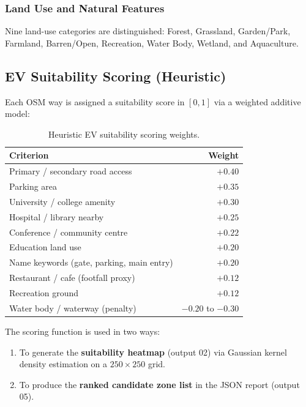 \documentclass[12pt, a4paper]{article}
\begin{document}
\subsubsection{Land Use and Natural Features}

Nine land-use categories are distinguished: Forest, Grassland, 
Garden/Park, Farmland, Barren/Open, Recreation, Water Body, Wetland, 
and Aquaculture.

\subsection{EV Suitability Scoring (Heuristic)}

Each OSM way is assigned a suitability score in $[0, 1]$ via a 
weighted additive model:

\begin{table}[H]
\centering
\caption{Heuristic EV suitability scoring weights.}
\label{tab:ev_score}
\begin{tabular}{@{}lr@{}}
\toprule
\textbf{Criterion} & \textbf{Weight} \\
\midrule
Primary / secondary road access & $+0.40$ \\
Parking area & $+0.35$ \\
University / college amenity & $+0.30$ \\
Hospital / library nearby & $+0.25$ \\
Conference / community centre & $+0.22$ \\
Education land use & $+0.20$ \\
Name keywords (gate, parking, main entry) & $+0.20$ \\
Restaurant / cafe (footfall proxy) & $+0.12$ \\
Recreation ground & $+0.12$ \\
Water body / waterway (penalty) & $-0.20$ to $-0.30$ \\
\bottomrule
\end{tabular}
\end{table}

The scoring function is used in two ways:
\begin{enumerate}
    \item To generate the \textbf{suitability heatmap} (output 02) via 
    Gaussian kernel density estimation on a $250 \times 250$ grid.
    \item To produce the \textbf{ranked candidate zone list} in the 
    JSON report (output 05).
\end{enumerate}
\end{document}
